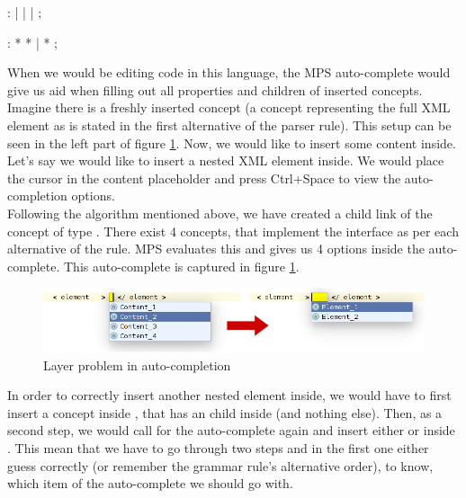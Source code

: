 \begin{antlr}
	    :   
           |   
           |   
           |   
           ;

	    :   \literal{<}  * \literal{>} * \literal{</}  \literal{>}
           |   \literal{<}  * \literal{/>}
           ;
\end{antlr}

When we would be editing code in this language, the MPS auto-complete would give us aid when filling out all properties and children of inserted concepts.
Imagine there is a freshly inserted  concept (a concept representing the full XML element as is stated in the first alternative of the  parser rule).
This setup can be seen in the left part of figure \ref{fig:layer_problem}.
Now, we would like to insert some content inside.
Let's say we would like to insert a nested XML element inside.
We would place the cursor in the content placeholder and press Ctrl+Space to view the auto-completion options.
\\

Following the algorithm mentioned above, we have created a child link of the  concept of type .
There exist 4 concepts, that implement the  interface as per each alternative of the rule.
MPS evaluates this and gives us 4 options inside the auto-complete.
This auto-complete is captured in figure \ref{fig:layer_problem}.

\begin{figure}[h]
	\centering
	\includegraphics[width=\textwidth]{./img/layer_problem.png}
	\caption{Layer problem in auto-completion}
	\label{fig:layer_problem}
\end{figure}

In order to correctly insert another nested element inside, we would have to first insert a  concept inside , that has an  child inside (and nothing else).
Then, as a second step, we would call for the auto-complete again and insert either  or  inside .
This mean that we have to go through two steps and in the first one either guess correctly (or remember the grammar rule's alternative order), to know, which item of the auto-complete we should go with.
\\

